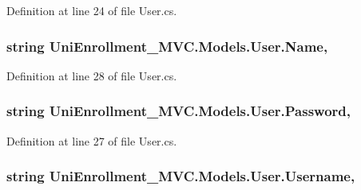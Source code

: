 Definition at line 24 of file User.\+cs.

\subsubsection[{\texorpdfstring{Name}{Name}}]{\setlength{\rightskip}{0pt plus 5cm}string Uni\+Enrollment\+\_\+\+M\+V\+C.\+Models.\+User.\+Name\hspace{0.3cm}{\ttfamily [get]}, {\ttfamily [set]}}\hypertarget{class_uni_enrollment___m_v_c_1_1_models_1_1_user_ac34d9112ca308c7ca425c344c5d05a79}{}\label{class_uni_enrollment___m_v_c_1_1_models_1_1_user_ac34d9112ca308c7ca425c344c5d05a79}


Definition at line 28 of file User.\+cs.

\subsubsection[{\texorpdfstring{Password}{Password}}]{\setlength{\rightskip}{0pt plus 5cm}string Uni\+Enrollment\+\_\+\+M\+V\+C.\+Models.\+User.\+Password\hspace{0.3cm}{\ttfamily [get]}, {\ttfamily [set]}}\hypertarget{class_uni_enrollment___m_v_c_1_1_models_1_1_user_a9f4573eb934d5201cfbb5eb769b057bf}{}\label{class_uni_enrollment___m_v_c_1_1_models_1_1_user_a9f4573eb934d5201cfbb5eb769b057bf}


Definition at line 27 of file User.\+cs.

\subsubsection[{\texorpdfstring{Username}{Username}}]{\setlength{\rightskip}{0pt plus 5cm}string Uni\+Enrollment\+\_\+\+M\+V\+C.\+Models.\+User.\+Username\hspace{0.3cm}{\ttfamily [get]}, {\ttfamily [set]}}\hypertarget{class_uni_enrollment___m_v_c_1_1_models_1_1_user_a9c852662d106e22d53bb00bfc8945423}{}\label{class_uni_enrollment___m_v_c_1_1_models_1_1_user_a9c852662d106e22d53bb00bfc8945423}


